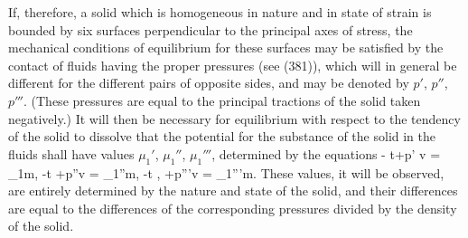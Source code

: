 \documentclass[12pt]{memoir}
\begin{document}
{If, therefore, a solid which is homogeneous in nature and in state of strain is bounded by six surfaces perpendicular to the principal axes of stress, the mechanical conditions of equilibrium for these surfaces may be satisfied by the contact of fluids having the proper pressures (see (381)), which will in general be different for the different pairs of opposite sides, and may be denoted by $p'$, $p''$, $p'''$. (These pressures are equal to the principal tractions of the solid taken negatively.) It will then be necessary for equilibrium with respect to the tendency of the solid to dissolve that the potential for the substance of the solid in the fluids shall have values $\mu_1'$, $\mu_1''$, $\mu_1'''$, determined by the equations
\eqs \epsilon- t\eta +p' v  = \mu_1m,     \label{393}\eqe
\eqs \epsilon-t \eta +p''v =   \mu_1''m,    \label{394}\eqe
\eqs \epsilon-t \eta, +p'''v = \mu_1'''m.    \label{395}\eqe
These values, it will be observed, are entirely determined by the nature and state of the solid, and their differences are equal to the differences of the corresponding pressures divided by the density of the solid.


}
\end{document}
